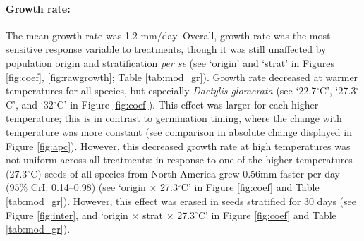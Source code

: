 \documentclass[11pt]{article}\usepackage[]{graphicx}\usepackage[]{color}
\begin{document}
	\paragraph{Growth rate:} The mean growth rate was 1.2 mm/day. Overall, growth rate was the most sensitive response variable to treatments, though it was still unaffected by population origin  and stratification \textit{per se} (see `origin' and `strat' in Figures \ref{fig:coef}, \ref{fig:rawgrowth}; Table \ref{tab:mod_gr}). Growth rate decreased at warmer temperatures for all species, but especially \textit{Dactylis glomerata} (see `22.7$^{\circ}$C', `27.3$^{\circ}$C', and `32$^{\circ}$C' in Figure \ref{fig:coef}). This effect was larger for each higher temperature; this is in contrast to germination timing, where the change with temperature was more constant (see comparison in absolute change displayed in Figure \ref{fig:apc}). However, this decreased growth rate at high temperatures was not uniform across all treatments: in response to one of the higher temperatures (27.3$^{\circ}$C) seeds of all species from North America grew 0.56mm faster per day (95\% CrI: 0.14--0.98) (see `origin $\times$  27.3$^{\circ}$C' in Figure \ref{fig:coef} and Table \ref{tab:mod_gr}). However, this  effect was erased in seeds stratified for 30 days %
	(see Figure \ref{fig:inter}, and  `origin $\times$ strat $\times$ 27.3$^{\circ}$C' in Figure \ref{fig:coef} and Table \ref{tab:mod_gr}). 
	

\end{document}

